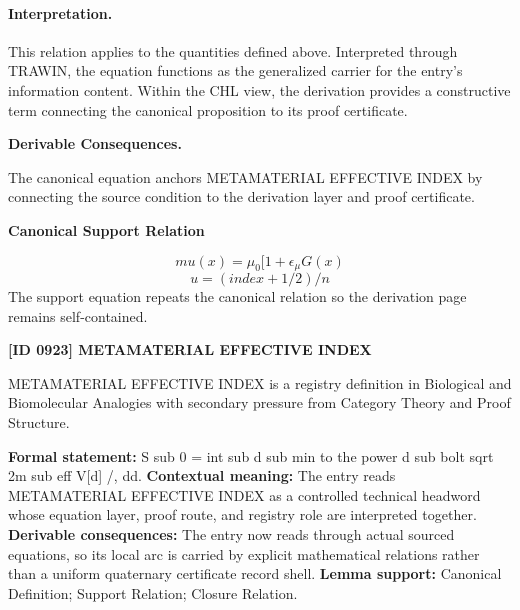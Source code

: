 \paragraph{Interpretation.}
This relation applies to the quantities defined above. Interpreted through TRAWIN, the equation functions as the generalized carrier for the entry’s information content. Within the CHL view, the derivation provides a constructive term connecting the canonical proposition to its proof certificate.

\par\vspace{0.35em}
\noindent\textbf{Derivable Consequences.}\quad
\begingroup
\footnotesize
\raggedright
The canonical equation anchors METAMATERIAL EFFECTIVE INDEX by connecting the source condition to the derivation layer and proof certificate.
\par\endgroup

\noindent\textbf{Canonical Support Relation}\par
\[
mu(x)=\mu_{0}[1+\epsilon_{\mu}G(x)
\]
\[
u = (index + 1/2)/n
\]
\noindent The support equation repeats the canonical relation so the derivation page remains self-contained.\par

\clearpage
\noindent\textbf{[ID 0923] METAMATERIAL EFFECTIVE INDEX}\par
\vspace{0.35em}
\begingroup\small
{}
METAMATERIAL EFFECTIVE INDEX is a registry definition in Biological and Biomolecular Analogies with secondary pressure from Category Theory and Proof Structure.

\begingroup\footnotesize\setlength{\emergencystretch}{3em}\sloppy
\textbf{Formal statement:} S sub 0 = int sub d sub min to the power d sub bolt sqrt 2m sub eff V[d] /, dd. \textbf{Contextual meaning:} The entry reads METAMATERIAL EFFECTIVE INDEX as a controlled technical headword whose equation layer, proof route, and registry role are interpreted together. \textbf{Derivable consequences:} The entry now reads through actual sourced equations, so its local arc is carried by explicit mathematical relations rather than a uniform quaternary certificate record shell. \textbf{Lemma support:} Canonical Definition; Support Relation; Closure Relation.\par
\endgroup


